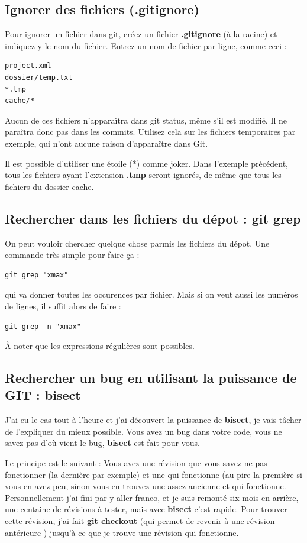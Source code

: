 \documentclass[a4paper,twoside]{article}
\begin{document}
\subsection{Ignorer des fichiers (.gitignore)}\label{sec:gitignore}
Pour ignorer un fichier dans git, créez un fichier \textbf{.gitignore} (à la racine) et indiquez-y le nom du fichier. Entrez un nom de fichier par ligne, comme ceci :
\begin{verbatim}
project.xml
dossier/temp.txt
*.tmp
cache/*
\end{verbatim}
Aucun de ces fichiers n'apparaîtra dans git status, même s'il est modifié. Il ne paraîtra donc pas dans les commits.
Utilisez cela sur les fichiers temporaires par exemple, qui n'ont aucune raison d'apparaître dans Git.

Il est possible d'utiliser une étoile (*) comme joker. Dans l'exemple précédent, tous les fichiers ayant l'extension \textbf{.tmp} seront ignorés, de même que tous les fichiers du dossier cache.

\subsection{Rechercher dans les fichiers du dépot : git grep}
On peut vouloir chercher quelque chose parmis les fichiers du dépot. Une commande très simple pour faire ça : 
\begin{verbatim}
git grep "xmax"
\end{verbatim}
qui va donner toutes les occurences par fichier. Mais si on veut aussi les numéros de lignes, il suffit alors de faire :
\begin{verbatim}
git grep -n "xmax"
\end{verbatim}

\begin{remarque}
À noter que les expressions régulières sont possibles.
\end{remarque}

\subsection{Rechercher un bug en utilisant la puissance de GIT : bisect}
J'ai eu le cas tout à l'heure et j'ai découvert la puissance de \textbf{bisect}, je vais tâcher de l'expliquer du mieux possible. Vous avez un bug dans votre code, vous ne savez pas d'où vient le bug, \textbf{bisect} est fait pour vous. 

Le principe est le suivant : Vous avez une révision que vous savez ne pas fonctionner (la dernière par exemple) et une qui fonctionne (au pire la première si vous en avez peu, sinon vous en trouvez une assez ancienne et qui fonctionne. Personnellement j'ai fini par y aller franco, et je suis remonté six mois en arrière, une centaine de révisions à tester, mais avec \textbf{bisect} c'est rapide. Pour trouver cette révision, j'ai fait \textbf{git checkout} (qui permet de revenir à une révision antérieure ) jusqu'à ce que je trouve une révision qui fonctionne. 
\end{document}
